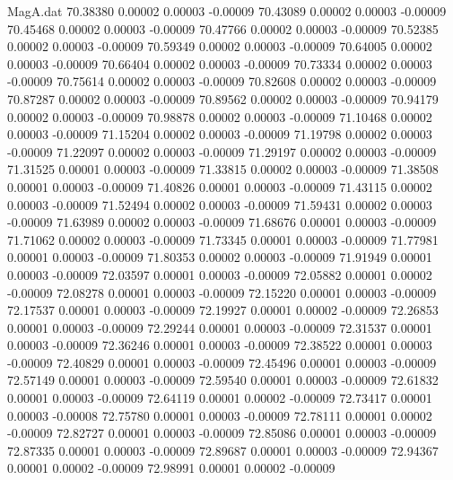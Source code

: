 \begin{filecontents}{MagA.dat}
  70.38380    0.00002    0.00003   -0.00009
  70.43089    0.00002    0.00003   -0.00009
  70.45468    0.00002    0.00003   -0.00009
  70.47766    0.00002    0.00003   -0.00009
  70.52385    0.00002    0.00003   -0.00009
  70.59349    0.00002    0.00003   -0.00009
  70.64005    0.00002    0.00003   -0.00009
  70.66404    0.00002    0.00003   -0.00009
  70.73334    0.00002    0.00003   -0.00009
  70.75614    0.00002    0.00003   -0.00009
  70.82608    0.00002    0.00003   -0.00009
  70.87287    0.00002    0.00003   -0.00009
  70.89562    0.00002    0.00003   -0.00009
  70.94179    0.00002    0.00003   -0.00009
  70.98878    0.00002    0.00003   -0.00009
  71.10468    0.00002    0.00003   -0.00009
  71.15204    0.00002    0.00003   -0.00009
  71.19798    0.00002    0.00003   -0.00009
  71.22097    0.00002    0.00003   -0.00009
  71.29197    0.00002    0.00003   -0.00009
  71.31525    0.00001    0.00003   -0.00009
  71.33815    0.00002    0.00003   -0.00009
  71.38508    0.00001    0.00003   -0.00009
  71.40826    0.00001    0.00003   -0.00009
  71.43115    0.00002    0.00003   -0.00009
  71.52494    0.00002    0.00003   -0.00009
  71.59431    0.00002    0.00003   -0.00009
  71.63989    0.00002    0.00003   -0.00009
  71.68676    0.00001    0.00003   -0.00009
  71.71062    0.00002    0.00003   -0.00009
  71.73345    0.00001    0.00003   -0.00009
  71.77981    0.00001    0.00003   -0.00009
  71.80353    0.00002    0.00003   -0.00009
  71.91949    0.00001    0.00003   -0.00009
  72.03597    0.00001    0.00003   -0.00009
  72.05882    0.00001    0.00002   -0.00009
  72.08278    0.00001    0.00003   -0.00009
  72.15220    0.00001    0.00003   -0.00009
  72.17537    0.00001    0.00003   -0.00009
  72.19927    0.00001    0.00002   -0.00009
  72.26853    0.00001    0.00003   -0.00009
  72.29244    0.00001    0.00003   -0.00009
  72.31537    0.00001    0.00003   -0.00009
  72.36246    0.00001    0.00003   -0.00009
  72.38522    0.00001    0.00003   -0.00009
  72.40829    0.00001    0.00003   -0.00009
  72.45496    0.00001    0.00003   -0.00009
  72.57149    0.00001    0.00003   -0.00009
  72.59540    0.00001    0.00003   -0.00009
  72.61832    0.00001    0.00003   -0.00009
  72.64119    0.00001    0.00002   -0.00009
  72.73417    0.00001    0.00003   -0.00008
  72.75780    0.00001    0.00003   -0.00009
  72.78111    0.00001    0.00002   -0.00009
  72.82727    0.00001    0.00003   -0.00009
  72.85086    0.00001    0.00003   -0.00009
  72.87335    0.00001    0.00003   -0.00009
  72.89687    0.00001    0.00003   -0.00009
  72.94367    0.00001    0.00002   -0.00009
  72.98991    0.00001    0.00002   -0.00009

\end{filecontents}
